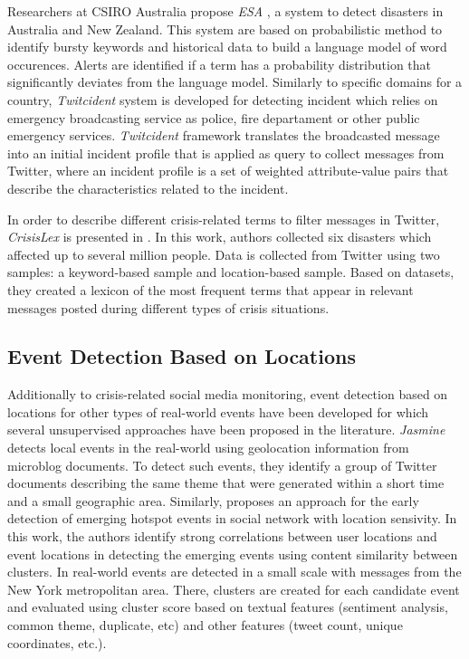 \documentclass[sigconf]{acmart}
\begin{document}
Researchers at CSIRO Australia propose \textit{ESA} \cite{cameron2012emergency,yin2012esa}, a system to detect disasters in Australia and New Zealand. This system are based on probabilistic method to identify bursty keywords and historical data to build a language model of word occurences. Alerts are identified if a term has a probability distribution that significantly deviates from the language model. Similarly to specific domains for a country, \textit{Twitcident} \cite{abel2012twitcident} system is developed for detecting incident which relies on emergency broadcasting service as police, fire departament or other public emergency services. \textit{Twitcident} framework translates the broadcasted message into an initial incident profile that is applied as query to collect messages from Twitter, where an incident profile is a set of weighted attribute-value pairs that describe the characteristics related to the incident. 

In order to describe different crisis-related terms to filter messages in Twitter, \textit{CrisisLex} is presented in \cite{olteanu2014}. In this work,
authors collected six disasters which affected up to several million people. Data is collected from Twitter using two samples: a keyword-based sample and location-based sample. Based on datasets, they created a lexicon of the most frequent terms that appear in relevant messages posted during different types of crisis situations.

\subsection{Event Detection Based on Locations}

Additionally to crisis-related social media monitoring, event detection based on locations for other types of real-world events have been developed for which several unsupervised approaches have been proposed in the literature. \textit{Jasmine} \cite{watanabe2011jasmine} detects local events in the real-world using geolocation information from microblog documents. To detect such events, they identify a group of Twitter documents describing the same theme that were generated within a short time and a small geographic area. Similarly, \cite{unankard2015emerging} proposes an approach for the early detection of emerging hotspot events in social network with location sensivity. In this work, the authors identify strong correlations between user locations and event locations in detecting the emerging events using content similarity between clusters. In \cite{walther2013geo} real-world events are detected in a small scale with messages from the New York metropolitan area. There, clusters are created for each candidate event and evaluated using cluster score based on textual features (sentiment analysis, common theme, duplicate, etc) and other features (tweet count, unique coordinates, etc.).
\end{document}
